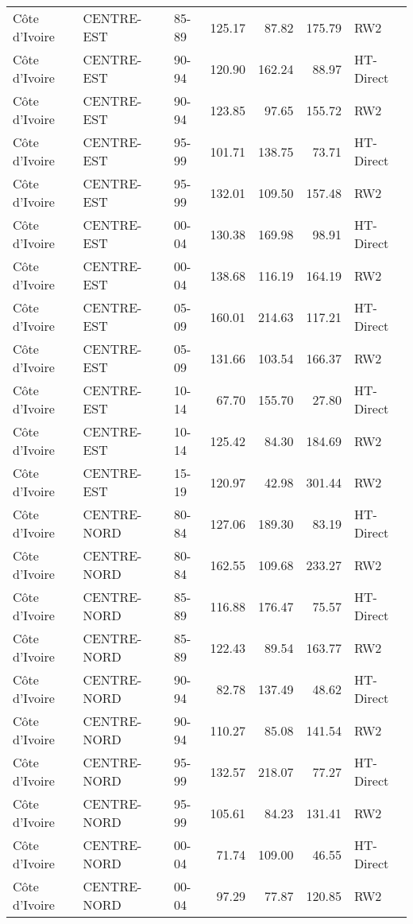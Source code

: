 \begin{longtable}{lllrrrl}
  C\^{o}te d'Ivoire & CENTRE-EST & 85-89 & 125.17 & 87.82 & 175.79 & RW2 \\ 
  C\^{o}te d'Ivoire & CENTRE-EST & 90-94 & 120.90 & 162.24 & 88.97 & HT-Direct \\ 
  C\^{o}te d'Ivoire & CENTRE-EST & 90-94 & 123.85 & 97.65 & 155.72 & RW2 \\ 
  C\^{o}te d'Ivoire & CENTRE-EST & 95-99 & 101.71 & 138.75 & 73.71 & HT-Direct \\ 
  C\^{o}te d'Ivoire & CENTRE-EST & 95-99 & 132.01 & 109.50 & 157.48 & RW2 \\ 
  C\^{o}te d'Ivoire & CENTRE-EST & 00-04 & 130.38 & 169.98 & 98.91 & HT-Direct \\ 
  C\^{o}te d'Ivoire & CENTRE-EST & 00-04 & 138.68 & 116.19 & 164.19 & RW2 \\ 
  C\^{o}te d'Ivoire & CENTRE-EST & 05-09 & 160.01 & 214.63 & 117.21 & HT-Direct \\ 
  C\^{o}te d'Ivoire & CENTRE-EST & 05-09 & 131.66 & 103.54 & 166.37 & RW2 \\ 
  C\^{o}te d'Ivoire & CENTRE-EST & 10-14 & 67.70 & 155.70 & 27.80 & HT-Direct \\ 
  C\^{o}te d'Ivoire & CENTRE-EST & 10-14 & 125.42 & 84.30 & 184.69 & RW2 \\ 
  C\^{o}te d'Ivoire & CENTRE-EST & 15-19 & 120.97 & 42.98 & 301.44 & RW2 \\ 
  C\^{o}te d'Ivoire & CENTRE-NORD & 80-84 & 127.06 & 189.30 & 83.19 & HT-Direct \\ 
  C\^{o}te d'Ivoire & CENTRE-NORD & 80-84 & 162.55 & 109.68 & 233.27 & RW2 \\ 
  C\^{o}te d'Ivoire & CENTRE-NORD & 85-89 & 116.88 & 176.47 & 75.57 & HT-Direct \\ 
  C\^{o}te d'Ivoire & CENTRE-NORD & 85-89 & 122.43 & 89.54 & 163.77 & RW2 \\ 
  C\^{o}te d'Ivoire & CENTRE-NORD & 90-94 & 82.78 & 137.49 & 48.62 & HT-Direct \\ 
  C\^{o}te d'Ivoire & CENTRE-NORD & 90-94 & 110.27 & 85.08 & 141.54 & RW2 \\ 
  C\^{o}te d'Ivoire & CENTRE-NORD & 95-99 & 132.57 & 218.07 & 77.27 & HT-Direct \\ 
  C\^{o}te d'Ivoire & CENTRE-NORD & 95-99 & 105.61 & 84.23 & 131.41 & RW2 \\ 
  C\^{o}te d'Ivoire & CENTRE-NORD & 00-04 & 71.74 & 109.00 & 46.55 & HT-Direct \\ 
  C\^{o}te d'Ivoire & CENTRE-NORD & 00-04 & 97.29 & 77.87 & 120.85 & RW2 \\ 

\end{longtable}
